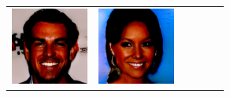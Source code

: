 \documentclass{article}
\newcommand{\pganw}{1.0in}
\begin{document}
\begin{table}[htbp]
\begin{center}
\begin{tabular}{cc|cc|cc}
\includegraphics[width=\pganw]{figures/pgan/10_base_raw_base.png} &
\includegraphics[width=\pganw]{figures/pgan/11_base_raw_base.png} &

\end{tabular}
\end{center}
\end{table}
\end{document}
